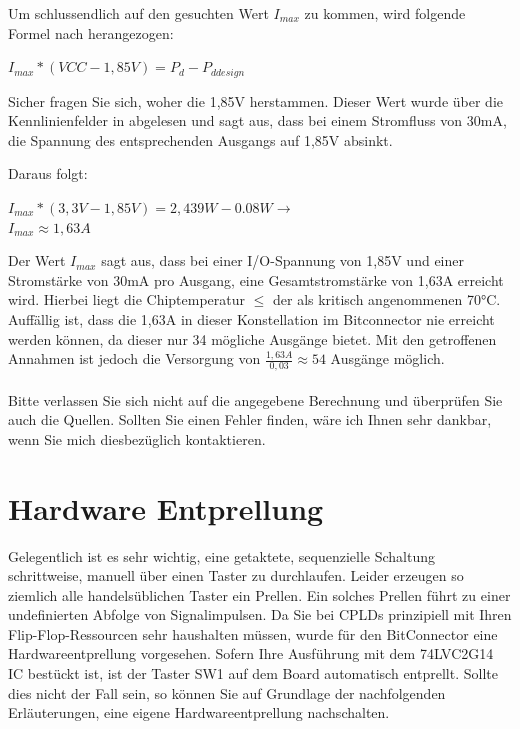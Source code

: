 \documentclass{article}
\begin{document}
Um schlussendlich auf den gesuchten Wert $I_{max}$ zu kommen, wird folgende Formel nach \autocite[16]{XC95_maxI} herangezogen:

\begin{center}
	$I_{max} * (VCC - 1,85V) = P_d - P_{ddesign}$
\end{center}

Sicher fragen Sie sich, woher die 1,85V herstammen. Dieser Wert wurde über die Kennlinienfelder in \autocite[6]{XC_Curves} abgelesen und sagt aus, dass bei einem Stromfluss von 30mA, die Spannung des entsprechenden Ausgangs auf 1,85V absinkt.

Daraus folgt: 
\begin{center}
	$I_{max} * (3,3V - 1,85V) = 2,439 W - 0.08W \rightarrow$\\
	\underline{\underline{$I_{max}\approx 1,63A $}}
\end{center}
Der Wert $I_{max}$ sagt aus, dass bei einer I/O-Spannung von 1,85V und einer Stromstärke von 30mA pro Ausgang, eine Gesamtstromstärke von 1,63A erreicht wird. Hierbei liegt die Chiptemperatur $\leq $ der als kritisch angenommenen 70$\si{\celsius}$. Auffällig ist, dass die 1,63A in dieser Konstellation im Bitconnector nie erreicht werden können, da dieser nur 34 mögliche Ausgänge bietet. Mit den getroffenen Annahmen ist jedoch die Versorgung von $\frac{1,63A}{0,03}\approx54$ Ausgänge möglich.\\\\
Bitte verlassen Sie sich nicht auf die angegebene Berechnung und überprüfen Sie auch die Quellen. Sollten Sie einen Fehler finden, wäre ich Ihnen sehr dankbar, wenn Sie mich diesbezüglich kontaktieren.

\section{Hardware Entprellung}
Gelegentlich ist es sehr wichtig, eine getaktete, sequenzielle Schaltung schrittweise, manuell über einen Taster zu durchlaufen. Leider erzeugen so ziemlich alle handelsüblichen Taster ein Prellen. Ein solches Prellen führt zu einer undefinierten Abfolge von Signalimpulsen. Da Sie bei CPLDs prinzipiell mit Ihren Flip-Flop-Ressourcen sehr haushalten müssen, wurde für den BitConnector eine Hardwareentprellung vorgesehen. Sofern Ihre Ausführung mit dem 74LVC2G14 IC bestückt ist, ist der Taster SW1 auf dem Board automatisch entprellt. Sollte dies nicht der Fall sein, so können Sie auf Grundlage der nachfolgenden Erläuterungen, eine eigene Hardwareentprellung nachschalten.
\end{document}
